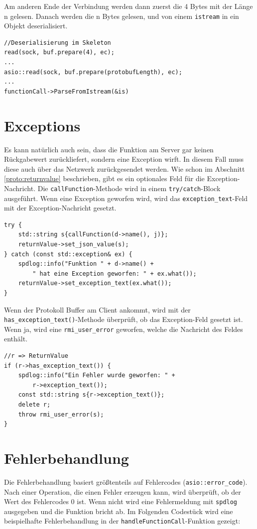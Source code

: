 \documentclass[a4paper,oneside,10pt]{report}
\begin{document}
Am anderen Ende der Verbindung werden dann zuerst die 4 Bytes mit der Länge n gelesen. Danach werden die n Bytes gelesen, und von einem \texttt{istream} in ein Objekt deserialisiert.

\begin{lstlisting}
//Deserialisierung im Skeleton
read(sock, buf.prepare(4), ec);
...
asio::read(sock, buf.prepare(protobufLength), ec);
...
functionCall->ParseFromIstream(&is)
\end{lstlisting}

\section{Exceptions}

Es kann natürlich auch sein, dass die Funktion am Server gar keinen Rückgabewert zurückliefert, sondern eine Exception wirft. In diesem Fall muss diese auch über das Netzwerk zurückgesendet werden. Wie schon im Abschnitt \ref{proto:returnvalue} beschrieben, gibt es ein optionales Feld für die Exception-Nachricht. Die \texttt{callFunction}-Methode wird in einem \texttt{try/catch}-Block ausgeführt. Wenn eine Exception geworfen wird, wird das \texttt{exception\_text}-Feld mit der Exception-Nachricht gesetzt. 

\begin{lstlisting}
try {  
	std::string s{callFunction(d->name(), j)};
	returnValue->set_json_value(s);
} catch (const std::exception& ex) {
	spdlog::info("Funktion " + d->name() + 
		" hat eine Exception geworfen: " + ex.what());
	returnValue->set_exception_text(ex.what());
}
\end{lstlisting}

Wenn der Protokoll Buffer am Client ankommt, wird mit der \texttt{has\_exception\_text()}-Methode überprüft, ob das Exception-Feld gesetzt ist. Wenn ja, wird eine \texttt{rmi\_user\_error} geworfen, welche die Nachricht des Feldes enthält.

\begin{lstlisting}
//r => ReturnValue
if (r->has_exception_text()) {
	spdlog::info("Ein Fehler wurde geworfen: " + 
		r->exception_text());
	const std::string s{r->exception_text()};
	delete r;
	throw rmi_user_error(s);
}
\end{lstlisting}

\section{Fehlerbehandlung}

Die Fehlerbehandlung basiert größtenteils auf Fehlercodes (\texttt{asio::error\_code}). Nach einer Operation, die einen Fehler erzeugen kann, wird überprüft, ob der Wert des Fehlercodes 0 ist. Wenn nicht wird eine Fehlermeldung mit \texttt{spdlog} ausgegeben und die Funktion bricht ab. Im Folgenden Codestück wird eine beispielhafte Fehlerbehandlung in der \texttt{handleFunctionCall}-Funktion gezeigt:
\end{document}
